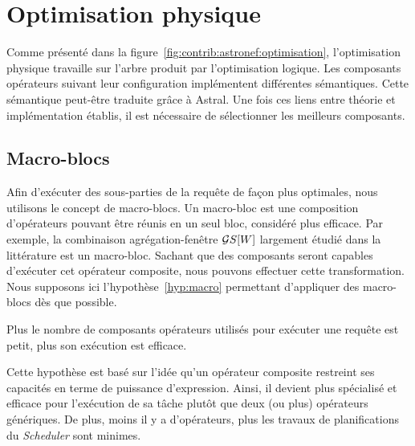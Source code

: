 \section{Optimisation physique}\label{sec:contrib:astronef:physique}
Comme présenté dans la figure~\ref{fig:contrib:astronef:optimisation}, l'optimisation physique travaille sur l'arbre produit par l'optimisation logique. Les composants opérateurs suivant leur configuration implémentent différentes sémantiques. Cette sémantique peut-être traduite grâce à Astral. Une fois ces liens entre théorie et implémentation établis, il est nécessaire de sélectionner les meilleurs composants.

\subsection{Macro-blocs}
Afin d'exécuter des sous-parties de la requête de façon plus optimales, nous utilisons le concept de macro-blocs. Un macro-bloc est une composition d'opérateurs pouvant être réunis en un seul bloc, considéré plus efficace. Par exemple, la combinaison agrégation-fenêtre $\mathcal{G} S[W]$ largement étudié dans la littérature est un macro-bloc. Sachant que des composants seront capables d'exécuter cet opérateur composite, nous pouvons effectuer cette transformation. Nous supposons ici l'hypothèse~\ref{hyp:macro} permettant d'appliquer des macro-blocs dès que possible.
\begin{hyp}\label{hyp:macro}
    Plus le nombre de composants opérateurs utilisés pour exécuter une requête est petit, plus son exécution est efficace.
\end{hyp}

Cette hypothèse est basé sur l'idée qu'un opérateur composite restreint ses capacités en terme de puissance d'expression. Ainsi, il devient plus spécialisé et efficace pour l'exécution de sa tâche plutôt que deux (ou plus) opérateurs génériques. De plus, moins il y a d'opérateurs, plus les travaux de planifications du \textit{Scheduler} sont minimes.

